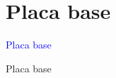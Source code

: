 \documentclass[10pt,xcolor={dvipsnames}]{beamer}
\begin{document}
\section{Placa base}
\begin{frame}
\begin{center}
\Huge{\textcolor{blue}{Placa base}}
\end{center}
\end{frame}

\begin{frame}{Placa base}
\begin{center}
\end{center}
\end{frame}
\end{document}

